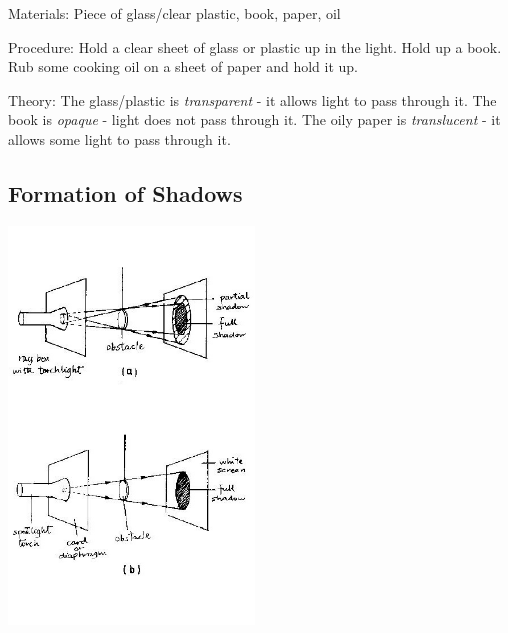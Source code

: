 \begin{multicols}{2}
\begin{description*}
\item[Materials:]{Piece of glass/clear plastic, book, paper, oil}
\item[Procedure:]{Hold a clear sheet of glass or plastic up in the light. Hold up a book. Rub some cooking oil on a sheet of paper and hold it up.}
\item[Theory:]{The glass/plastic is \emph{transparent} - it allows light to pass through it. The book is \emph{opaque} - light does not pass through it. The oily paper is \emph{translucent} - it allows some light to pass through it.}
\end{description*}

\subsection{Formation of Shadows}

\begin{center}
\includegraphics[width=0.49\textwidth]{./img/source/shadows.jpg}
\end{center}


\end{multicols}
